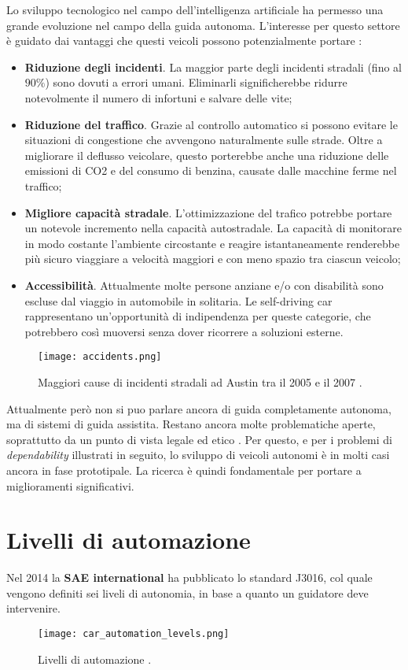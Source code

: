 Lo sviluppo tecnologico nel campo dell'intelligenza artificiale ha permesso una grande evoluzione nel campo della guida autonoma. L'interesse per questo 
settore è guidato dai vantaggi che questi veicoli possono potenzialmente portare \cite{advantages}:
\begin{itemize}
    \item \textbf{Riduzione degli incidenti}. La maggior parte degli incidenti stradali (fino al $90\%$) sono dovuti a errori umani. Eliminarli
    significherebbe ridurre notevolmente il numero di infortuni e salvare delle vite;
    \item \textbf{Riduzione del traffico}. Grazie al controllo automatico si possono evitare le situazioni di congestione che avvengono naturalmente sulle strade.
    Oltre a migliorare il deflusso veicolare, questo porterebbe anche  una riduzione delle emissioni di CO2 e del consumo di benzina, causate dalle macchine ferme nel traffico;
    \item \textbf{Migliore capacità stradale}. L'ottimizzazione del trafico potrebbe portare un notevole incremento nella capacità autostradale. La capacità
    di monitorare in modo costante l'ambiente circostante e reagire istantaneamente renderebbe più sicuro viaggiare a velocità maggiori e con meno spazio tra ciascun veicolo;
    \item \textbf{Accessibilità}. Attualmente  molte persone anziane  e/o con disabilità sono escluse dal viaggio in automobile in solitaria. Le self-driving car rappresentano un'opportunità
    di indipendenza per queste categorie, che potrebbero così muoversi senza dover ricorrere a soluzioni esterne.
\end{itemize}
\begin{figure}
    \texttt{[image: accidents.png]}
    \caption{Maggiori cause di incidenti stradali ad Austin tra il 2005 e il 2007 \cite{accid}.}
    \label{fig:accid}
\end{figure}
Attualmente però non si puo parlare ancora di guida completamente autonoma, ma di sistemi di guida assistita. Restano ancora molte problematiche aperte, soprattutto 
da un punto di vista legale \cite{legal} ed etico \cite{Lin2015}. Per questo, e per i problemi di \emph{dependability} illustrati in seguito, lo sviluppo
di veicoli autonomi è in molti casi ancora in fase prototipale. La ricerca è quindi fondamentale per portare a miglioramenti significativi.
\section{Livelli di automazione}
Nel 2014 la \textbf{SAE international} ha pubblicato lo standard J3016, col quale vengono definiti sei liveli di autonomia, in base a quanto un guidatore deve intervenire.
\begin{figure}
    \texttt{[image: car\_automation\_levels.png]}
    \caption{Livelli di automazione \cite{car}.}
    \label{fig:adaslevel}
\end{figure}
